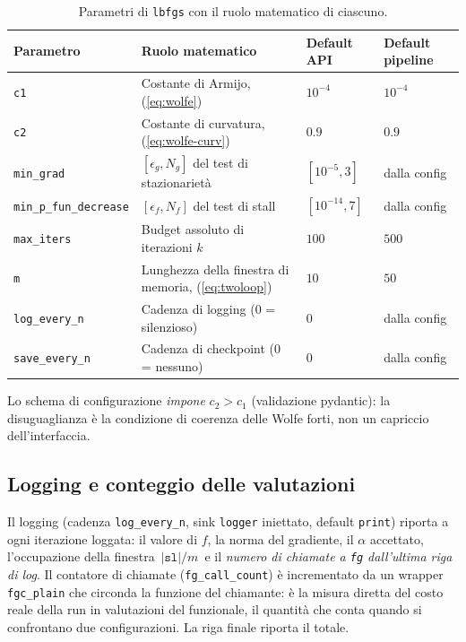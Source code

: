\begin{table}[htbp]
\centering
\small
\begin{tabular}{llll}
\toprule
Parametro & Ruolo matematico & Default API & Default pipeline \\
\midrule
\texttt{c1}        & Costante di Armijo, (\ref{eq:wolfe}) & $10^{-4}$ & $10^{-4}$ \\
\texttt{c2}        & Costante di curvatura, (\ref{eq:wolfe-curv}) & $0.9$ & $0.9$ \\
\texttt{min\_grad} & $[\epsilon_g, N_g]$ del test di stazionarietà & $[10^{-5}, 3]$ & dalla config \\
\texttt{min\_p\_fun\_decrease} & $[\epsilon_f, N_f]$ del test di stall & $[10^{-14}, 7]$ & dalla config \\
\texttt{max\_iters} & Budget assoluto di iterazioni $k$ & $100$ & $500$ \\
\texttt{m}         & Lunghezza della finestra di memoria, (\ref{eq:twoloop}) & $10$ & $50$ \\
\texttt{log\_every\_n} & Cadenza di logging (0 = silenzioso) & $0$ & dalla config \\
\texttt{save\_every\_n} & Cadenza di checkpoint (0 = nessuno) & $0$ & dalla config \\
\bottomrule
\end{tabular}
\caption{Parametri di \texttt{lbfgs} con il ruolo matematico di ciascuno.}
\end{table}

Lo schema di configurazione \emph{impone} $c_2 > c_1$ (validazione
pydantic): la disuguaglianza è la condizione di coerenza delle Wolfe
forti, non un capriccio dell'interfaccia.

\subsection{Logging e conteggio delle valutazioni}

Il logging (cadenza \texttt{log\_every\_n}, sink \texttt{logger}
iniettato, default \texttt{print}) riporta a ogni iterazione loggata: il
valore di $f$, la norma del gradiente, il $\alpha$ accettato, l'occupazione
della finestra $\,|\texttt{sl}|/m\,$ e il \emph{numero di chiamate a
\texttt{fg} dall'ultima riga di log}. Il contatore di chiamate
(\texttt{fg\_call\_count}) è incrementato da un wrapper
\texttt{fgc\_plain} che circonda la funzione del chiamante: è la misura
diretta del costo reale della run in valutazioni del funzionale, il
quantità che conta quando si confrontano due configurazioni. La riga
finale riporta il totale.

